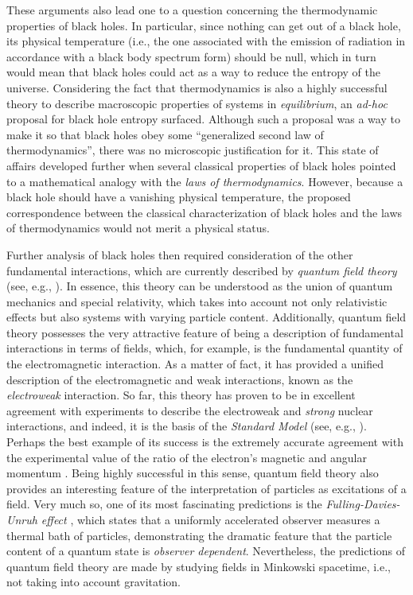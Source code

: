 \documentclass[
12pt,		%
openright,	%
twoside,  %
a4paper,			%
chapter=TITLE,		%
english,			%
french,				%
spanish,			%
brazil				%
]{USPSC-classe/USPSC}
\begin{document}
These arguments also lead one to a question concerning the thermodynamic properties of black holes. In particular, since nothing can get out of a black hole, its physical temperature (i.e., the one associated with the emission of radiation in accordance with a black body spectrum form) should be null, which in turn would mean that black holes could act as a way to reduce the entropy of the universe. Considering the fact that thermodynamics is also a highly successful theory to describe macroscopic properties of systems in \textit{equilibrium}, an \textit{ad-hoc} proposal for black hole entropy \cite{Bekenstein1972,Bekenstein1973} surfaced. Although such a proposal was a way to make it so that black holes obey some ``generalized second law of thermodynamics'', there was no microscopic justification for it. This state of affairs developed further when several classical properties of black holes \cite{Bardeen1973} pointed to a mathematical analogy with the \textit{laws of thermodynamics}. However, because a black hole should have a vanishing physical temperature, the proposed correspondence between the classical characterization of black holes and the laws of thermodynamics would not merit a physical status.

Further analysis of black holes then required consideration of the other fundamental interactions, which are currently described by \textit{quantum field theory} (see, e.g., \cite{Weinberg1995, Mandl1984}). In essence, this theory can be understood as the union of quantum mechanics and special relativity, which takes into account not only relativistic effects but also systems with varying particle content. Additionally, quantum field theory possesses the very attractive feature of being a description of fundamental interactions in terms of fields, which, for example, is the fundamental quantity of the electromagnetic interaction. As a matter of fact, it has provided a unified description of the electromagnetic and weak interactions, known as the \textit{electroweak} interaction. So far, this theory has proven to be in excellent agreement with experiments to describe the electroweak and \textit{strong} nuclear interactions, and indeed, it is the basis of the \textit{Standard Model} (see, e.g., \cite{Nagashima2010, Peskin1995}). Perhaps the best example of its success is the extremely accurate agreement with the experimental value of the ratio of the electron's magnetic and angular momentum \cite{Fan2022}. Being highly successful in this sense, quantum field theory also provides an interesting feature of the interpretation of particles as excitations of a field. Very much so, one of its most fascinating predictions is the \textit{Fulling-Davies-Unruh effect} \cite{Fulling1973,Davies1975,Unruh1976}, which states that a uniformly accelerated observer measures a thermal bath of particles, demonstrating the dramatic feature that the particle content of a quantum state is \textit{observer dependent}. Nevertheless, the predictions of quantum field theory are made by studying fields in Minkowski spacetime, i.e., not taking into account gravitation.
\end{document}
